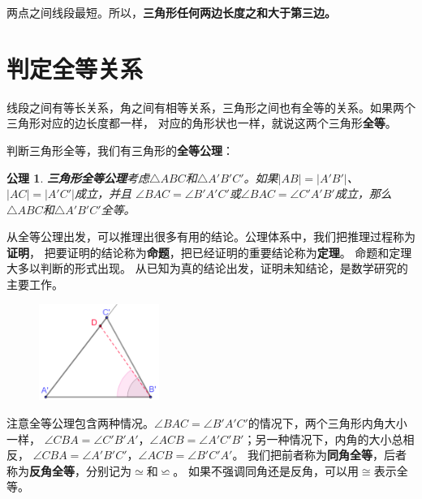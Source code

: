 \documentclass[12pt,UTF8]{ctexbook}
\newtheorem{po}{公理}
\begin{document}
两点之间线段最短。所以，\textbf{三角形任何两边长度之和大于第三边。}

\section{判定全等关系}
线段之间有等长关系，角之间有相等关系，三角形之间也有全等的关系。如果两个三角形对应的边长度都一样，
对应的角形状也一样，就说这两个三角形\textbf{全等}。

判断三角形全等，我们有三角形的\textbf{全等公理}：
\begin{po}{\textbf{三角形全等公理}}\label{po:7}
    考虑$\triangle ABC$和$\triangle A'B'C'$。如果$|AB| = |A'B'|$、$|AC| = |A'C'|$成立，并且
$\angle BAC = \angle B'A'C'$或$\angle BAC = \angle C'A'B'$成立，那么$\triangle ABC$和$\triangle A'B'C'$全等。
\end{po}

从全等公理出发，可以推理出很多有用的结论。公理体系中，我们把推理过程称为\textbf{证明}，
把要证明的结论称为\textbf{命题}，把已经证明的重要结论称为\textbf{定理}。
命题和定理大多以判断的形式出现。
从已知为真的结论出发，证明未知结论，是数学研究的主要工作。

\begin{figure} %
    \vspace{-15pt}
    \centering
    \includegraphics[width=0.35\textwidth]{三角形3.png}
\end{figure}

注意全等公理包含两种情况。$\angle BAC = \angle B'A'C'$的情况下，两个三角形内角大小一样，
$\angle CBA = \angle C'B'A'$，$\angle ACB = \angle A'C'B'$；另一种情况下，内角的大小总相反，
$\angle CBA = \angle A'B'C'$，$\angle ACB = \angle B'C'A'$。
我们把前者称为\textbf{同角全等}，后者称为\textbf{反角全等}，分别记为$\simeq$和$\backsimeq$。
如果不强调同角还是反角，可以用$\cong$表示全等。
\end{document}
